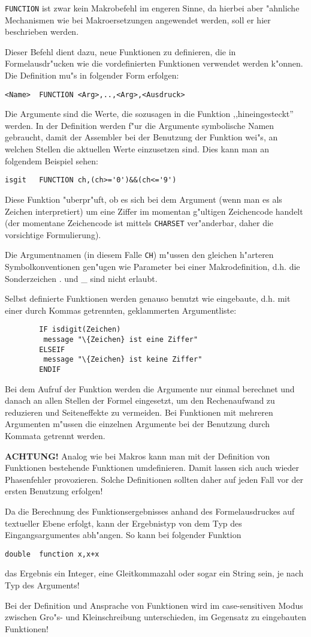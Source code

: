\documentclass[12pt,a4paper,twoside]{report}
\newcommand{\bb}[1]{{\bf #1}}
\newcommand{\tty}[1]{{\tt #1}}
\begin{document}
\tty{FUNCTION} ist zwar kein Makrobefehl im engeren Sinne, da
hierbei aber "ahnliche Mechanismen wie bei Makroersetzungen
angewendet werden, soll er hier beschrieben werden.
\par
Dieser Befehl dient dazu, neue Funktionen zu definieren, die in
Formel\-ausdr"ucken wie die vordefinierten Funktionen verwendet werden
k"onnen.  Die Definition mu"s in folgender Form erfolgen:
\begin{verbatim}
<Name>  FUNCTION <Arg>,..,<Arg>,<Ausdruck>
\end{verbatim}
Die Argumente sind die Werte, die sozusagen in die Funktion
,,hineingesteckt'' werden.  In der Definition werden f"ur die Argumente
symbolische Namen gebraucht, damit der Assembler bei der Benutzung
der Funktion wei"s, an welchen Stellen die aktuellen Werte einzusetzen
sind. Dies kann man an folgendem Beispiel sehen:
\begin{verbatim}
isgit   FUNCTION ch,(ch>='0')&&(ch<='9')
\end{verbatim}
Diese Funktion "uberpr"uft, ob es sich bei dem Argument (wenn man es
als Zeichen interpretiert) um eine Ziffer im momentan g"ultigen
Zeichencode handelt (der momentane Zeichencode ist mittels \tty{CHARSET}
ver"anderbar, daher die vorsichtige Formulierung).
\par
Die Argumentnamen (in diesem Falle \tty{CH}) m"ussen den gleichen h"arteren
Symbolkonventionen gen"ugen wie Parameter bei einer Makrodefinition,
d.h. die Sonderzeichen . und \_ sind nicht erlaubt.
\par
Selbst definierte Funktionen werden genauso benutzt wie eingebaute,
d.h. mit einer durch Kommas getrennten, geklammerten Argumentliste:
\begin{verbatim}
        IF isdigit(Zeichen)
         message "\{Zeichen} ist eine Ziffer"
        ELSEIF
         message "\{Zeichen} ist keine Ziffer"
        ENDIF
\end{verbatim}
\par
Bei dem Aufruf der Funktion werden die Argumente nur einmal berechnet
und danach an allen Stellen der Formel eingesetzt, um den
Rechenaufwand zu reduzieren und Seiteneffekte zu vermeiden.
Bei Funktionen mit mehreren Argumenten m"ussen die einzelnen Argumente
bei der Benutzung durch Kommata getrennt werden.
\par
\bb{ACHTUNG!} Analog wie bei Makros kann man mit der Definition von
Funktionen bestehende Funktionen umdefinieren.  Damit lassen sich auch
wieder Phasenfehler provozieren.  Solche Definitionen sollten daher auf
jeden Fall vor der ersten Benutzung erfolgen!
\par
Da die Berechnung des Funktionsergebnisses anhand des Formelausdruckes
auf textueller Ebene erfolgt, kann der Ergebnistyp von dem Typ des
Eingangsargumentes abh"angen.  So kann bei folgender Funktion
\begin{verbatim}
double  function x,x+x
\end{verbatim}
das Ergebnis ein Integer, eine Gleitkommazahl oder sogar ein String
sein, je nach Typ des Arguments!
\par
Bei der Definition und Ansprache von Funktionen wird im case-sensitiven
Modus zwischen Gro"s- und Kleinschreibung unterschieden, im Gegensatz
zu eingebauten Funktionen!
\end{document}
